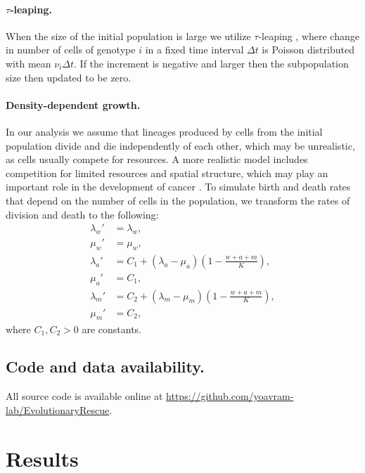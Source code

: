 \documentclass[12pt]{extarticle}
\begin{document}
\paragraph{$\tau$-leaping.}
When the size of the initial population is large we utilize $\tau$-leaping \citep{gillespie2001approximate}, where change in number of cells of genotype $i$ in a fixed time interval $\Delta t$ is Poisson distributed with mean $\nu_i\Delta t$.
If the increment is negative and larger then the subpopulation size then updated to be zero. %

\paragraph{Density-dependent growth.}

In our analysis we assume that lineages produced by cells from the initial population divide and die independently of each other, which may be unrealistic, as cells usually compete for resources.
A more realistic model includes competition for limited resources and spatial structure, which may play an important role in the development of cancer \citep[e.g.,][]{martens2011spatial}.
To simulate birth and death rates that depend on the number of cells in the population, we transform the rates of division and death to the following:
\begin{align*}
\lambda_w' &= \lambda_w, \\
\mu_w' &= \mu_w,\\
\lambda_a' &= C_1+\left(\lambda_a-\mu_a\right)\left(1-\frac{w+a+m}{K}\right),\\ 
\mu_a' &= C_1,\\
\lambda_m' &= C_2+\left(\lambda_m-\mu_m\right)\left(1-\frac{w+a+m}{K}\right),\\ 
\mu_m' &= C_2,
\end{align*}
where $C_1, C_2>0$ are constants. %

\subsection*{Code and data availability.} All source code is available online at \url{https://github.com/yoavram-lab/EvolutionaryRescue}.

\section*{Results}
\end{document}
